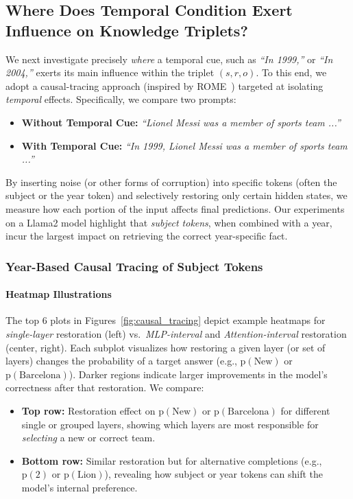 \subsection{Where Does Temporal Condition Exert Influence on Knowledge Triplets?}
\label{sec:temporal-influence}

We next investigate precisely \emph{where} a temporal cue, such as \textit{“In 1999,”} or \textit{“In 2004,”} exerts its main influence within the triplet $(s,r,o)$. 
To this end, we adopt a causal-tracing approach (inspired by ROME~\citep{rome}) targeted at isolating \emph{temporal} effects. 
Specifically, we compare two prompts:

\begin{itemize}
    \item \textbf{Without Temporal Cue:} \emph{“Lionel Messi was a member of sports team ...”}
    \item \textbf{With Temporal Cue:} \emph{“In 1999, Lionel Messi was a member of sports team ...”}
\end{itemize}

By inserting noise (or other forms of corruption) into specific tokens (often the subject or the year token) and selectively restoring only certain hidden states, we measure how each portion of the input affects final predictions. 
Our experiments on a Llama2 model highlight that \emph{subject tokens}, when combined with a year, incur the largest impact on retrieving the correct year-specific fact.

\subsubsection{Year-Based Causal Tracing of Subject Tokens}

\paragraph{Heatmap Illustrations}
The top 6 plots in Figures~\ref{fig:causal_tracing} depict example heatmaps for \emph{single-layer} restoration (left) vs.\ \emph{MLP-interval} and \emph{Attention-interval} restoration (center, right). 
Each subplot visualizes how restoring a given layer (or set of layers) changes the probability of a target answer (e.g., \(\mathrm{p}(\text{New})\) or \(\mathrm{p}(\text{Barcelona})\)). 
Darker regions indicate larger improvements in the model’s correctness after that restoration. 
We compare:

\begin{itemize}
    \item \textbf{Top row:} Restoration effect on \(\mathrm{p}(\text{New})\) or \(\mathrm{p}(\text{Barcelona})\) for different single or grouped layers, showing which layers are most responsible for \emph{selecting} a new or correct team.
    \item \textbf{Bottom row:} Similar restoration but for alternative completions (e.g., \(\mathrm{p}(2)\) or \(\mathrm{p}(\text{Lion})\)), revealing how subject or year tokens can shift the model’s internal preference.
\end{itemize}

